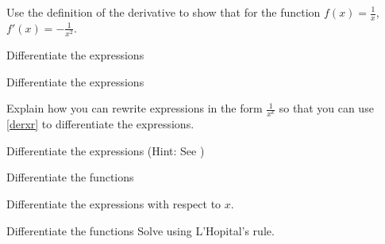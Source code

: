





\opgt

Use the definition of the derivative to show that for the function $f(x)=\frac{1}{x}$, $f'(x)=-\frac{1}{x^2}$.

Differentiate the expressions\os
{}

Differentiate the expressions \os
{}

Explain how you can rewrite expressions in the form $\frac{1}{x^k}$ so that you can use \eqref{derxr} to differentiate the expressions.

Differentiate the expressions (Hint: See )\os
{}

Differentiate the functions \os
{}

Differentiate the expressions with respect to $ x $. \os



\nes


Differentiate the functions \os
{}
\newpage
{}
Solve  using L'Hopital's rule.

